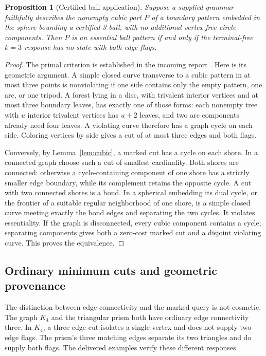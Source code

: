 \documentclass[11pt,a4paper]{article}
\newtheorem{proposition}[theorem]{Proposition}
\theoremstyle{definition}
\theoremstyle{remark}
\begin{document}
\begin{proposition}[Certified ball application]
\label{prop:ball}
Suppose a supplied grammar faithfully describes the nonempty cubic part $P$ of a boundary pattern embedded in the sphere bounding a certified 3-ball, with no additional vertex-free circle components. Then $P$ is an essential ball pattern if and only if the terminal-free $k=3$ response has no state with both edge flags.
\end{proposition}
\begin{proof}
The primal criterion is established in the incoming report \cite{fourcopy}. Here is its geometric argument. A simple closed curve transverse to a cubic pattern in at most three points is nonviolating if one side contains only the empty pattern, one arc, or one tripod. A forest lying in a disc, with trivalent interior vertices and at most three boundary leaves, has exactly one of those forms: each nonempty tree with $u$ interior trivalent vertices has $u+2$ leaves, and two arc components already need four leaves. A violating curve therefore has a graph cycle on each side. Coloring vertices by side gives a cut of at most three edges and both flags.

Conversely, by Lemma~\ref{lem:cubic}, a marked cut has a cycle on each shore. In a connected graph choose such a cut of smallest cardinality. Both shores are connected: otherwise a cycle-containing component of one shore has a strictly smaller edge boundary, while its complement retains the opposite cycle. A cut with two connected shores is a bond. In a spherical embedding its dual cycle, or the frontier of a suitable regular neighborhood of one shore, is a simple closed curve meeting exactly the bond edges and separating the two cycles. It violates essentiality. If the graph is disconnected, every cubic component contains a cycle; separating components gives both a zero-cost marked cut and a disjoint violating curve. This proves the equivalence.
\end{proof}

\subsection{Ordinary minimum cuts and geometric provenance}
The distinction between edge connectivity and the marked query is not cosmetic. The graph $K_4$ and the triangular prism both have ordinary edge connectivity three. In $K_4$, a three-edge cut isolates a single vertex and does not supply two edge flags. The prism's three matching edges separate its two triangles and do supply both flags. The delivered examples verify these different responses.
\end{document}
